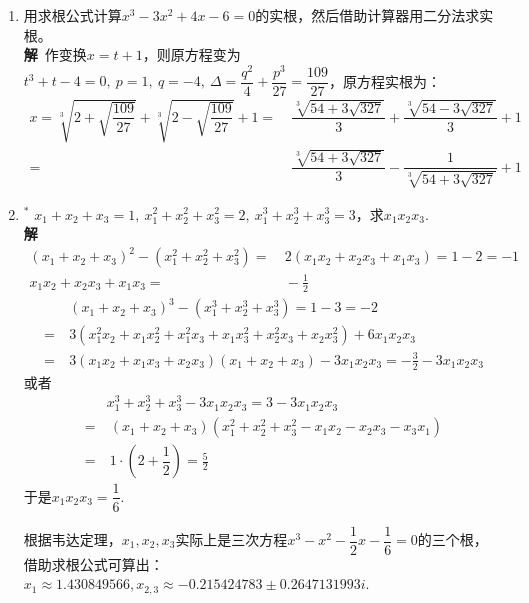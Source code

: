 \begin{enumerate}[label={【\textbf{例\thechapter.\arabic*}】},
 leftmargin=\inteval{\myenumleftmargin}pt,
 itemsep=\inteval{\myenumitempsep}pt,
 itemindent=\inteval{\myenumitemindent}pt]
\item 用求根公式计算$ x^3-3x^2+4x-6=0 $的实根，然后借助计算器用二分法求实根。\\
\textbf{解}\ 作变换$ x=t+1 $，则原方程变为$ t^3+t-4=0,\ p=1,\ q=-4,\ 
\Delta=\dfrac{q^2}{4}+\dfrac{p^3}{27}=\dfrac{109}{27} $，原方程实根为：
\begin{align*}
    x =\sqrt[3]{2+\sqrt{\dfrac{109}{27}}}+\sqrt[3]{2-\sqrt{\dfrac{109}{27}}}+1  
    =&\  \dfrac{\sqrt[3]{54+3\sqrt{327}}}{3}+\dfrac{\sqrt[3]{54-3\sqrt{327}}}{3}+1 \\
    =&\  \dfrac{\sqrt[3]{54+3\sqrt{327}}}{3}-\dfrac{1}{\sqrt[3]{54+3\sqrt{327}}}+1
\end{align*}

\item $ ^* $ $ x_1+x_2+x_3=1,\ x_1^2+x_2^2+x_3^2=2,\ 
x_1^3+x_2^3+x_3^3=3 $，求$ x_1x_2x_3 $. \\
\textbf{解}\ 
\begin{align*}
    (x_1+x_2+x_3)^2-(x_1^2+x_2^2+x_3^2)=&\ 2(x_1x_2+x_2x_3+x_1x_3)=1-2=-1\\
    x_1x_2+x_2x_3+x_1x_3=&\ -\frac{1}{2} 
\end{align*}
\begin{align*}
    &\ (x_1+x_2+x_3)^3-(x_1^3+x_2^3+x_3^3)=1-3=-2 \\
    =&\ 3(x_1^2x_2+x_1x_2^2+x_1^2x_3+x_1x_3^2+x_2^2x_3+x_2x_3^2)+6x_1x_2x_3\\
    =&\ 3(x_1x_2+x_1x_3+x_2x_3)(x_1+x_2+x_3)-3x_1x_2x_3
    =-\frac{3}{2}-3x_1x_2x_3
\end{align*}
或者
\begin{align*}
    & x_1^3+x_2^3+x_3^3-3x_1x_2x_3=3-3x_1x_2x_3  \\
    =&\  (x_1+x_2+x_3)(x_1^2+x_2^2+x_3^2-x_1x_2-x_2x_3-x_3x_1)\\
    =&\  1\cdot\left(2+\dfrac{1}{2}\right)=\frac{5}{2}
\end{align*}
于是$ x_1x_2x_3=\dfrac{1}{6} $. 

根据韦达定理，$ x_1,x_2,x_3 $实际上是三次方程$ x^3-x^2-\dfrac{1}{2}x-
\dfrac{1}{6}=0 $的三个根，
借助求根公式可算出：$ x_1 \approx 1.430849566,x_{2,3}\approx -0.215424783 
\pm 0.2647131993 i $. 


\end{enumerate}
